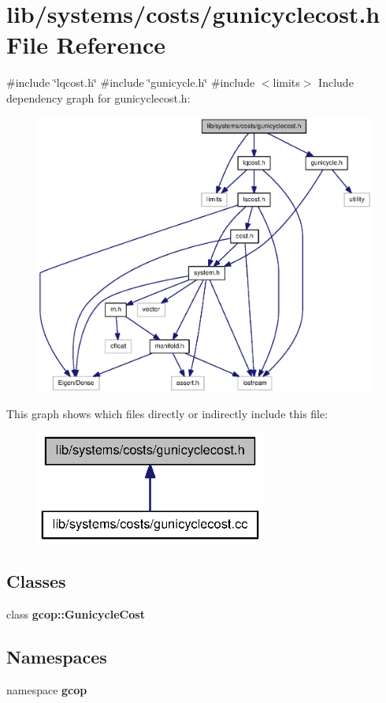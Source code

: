 \section{lib/systems/costs/gunicyclecost.h \-File \-Reference}
\label{gunicyclecost_8h}
{\ttfamily \#include \char`\"{}lqcost.\-h\char`\"{}}\*
{\ttfamily \#include \char`\"{}gunicycle.\-h\char`\"{}}\*
{\ttfamily \#include $<$limits$>$}\*
\-Include dependency graph for gunicyclecost.\-h\-:\nopagebreak
\begin{figure}[H]
\begin{center}
\leavevmode
\includegraphics[width=350pt]{gunicyclecost_8h__incl}
\end{center}
\end{figure}
\-This graph shows which files directly or indirectly include this file\-:\nopagebreak
\begin{figure}[H]
\begin{center}
\leavevmode
\includegraphics[width=214pt]{gunicyclecost_8h__dep__incl}
\end{center}
\end{figure}
\subsection*{\-Classes}
\begin{DoxyCompactItemize}
\item 
class {\bf gcop\-::\-Gunicycle\-Cost}
\end{DoxyCompactItemize}
\subsection*{\-Namespaces}
\begin{DoxyCompactItemize}
\item 
namespace {\bf gcop}
\end{DoxyCompactItemize}
